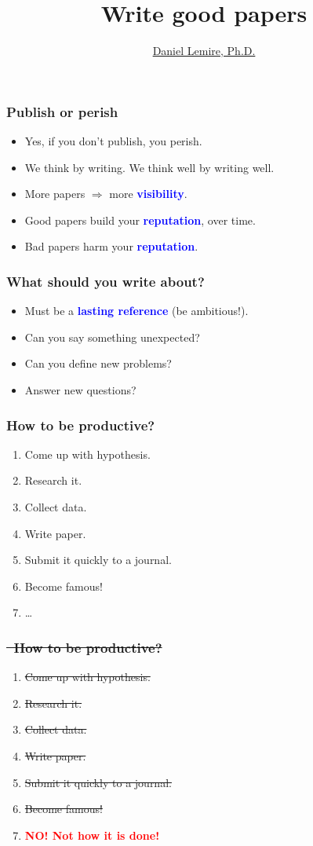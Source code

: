 \documentclass[handout]{beamer}
\title{Write good papers}
\date{}
\author{\href{http://lemire.me/en/}{Daniel Lemire, Ph.D.}}
\institute{
  Professor of Computer Science\\
  University of Quebec\\
	\url{http://lemire.me/en/}\\
	blog: \url{http://lemire.me/blog/}\\
	~\\
}
\date{}
\newcommand{\vimportant}[1]{\textcolor{red}{\textbf{#1}}}
\newcommand{\important}[1]{\textcolor{blue}{\textbf{#1}}}
\begin{document}
\frame{\titlepage}



\frame
{
  \frametitle{Publish or perish}
 \begin{itemize}
  \item<1-> Yes, if you don't publish, you perish.
\item<2-> We think by writing. We think well by writing well.
   \item<3-> More papers $\Rightarrow$ more \important{visibility}.
   \item<4-> Good papers build your \important{reputation}, over time.
   \item<5-> Bad papers harm your \important{reputation}.
 \end{itemize}
}




\frame
{
  \frametitle{What should you write about?}
 \begin{itemize}
  \item<1-> Must be a \important{lasting reference} (be ambitious!).
  \item<2-> Can you say something unexpected?
    \item<3-> Can you define new problems?
    \item<4-> Answer new questions?
  \end{itemize}
}


\frame
{
  \frametitle{How to be productive?}
 \begin{enumerate}
 \item Come up with hypothesis.
  \item Research it.
  \item Collect data.
  \item Write paper.
  \item Submit it quickly to a journal.
  \item Become famous!
  \item \ldots
 \end{enumerate}
}


\frame
{
  \frametitle{\sout{ How to be productive?} }
 \begin{enumerate}
 \item \sout {Come up with hypothesis.}
  \item \sout{ Research it.}
  \item \sout {Collect data.}
  \item \sout {Write paper.}
  \item \sout {Submit it quickly to a journal.}
  \item \sout {Become famous!}
  \item {\Large \vimportant{NO! Not how it is done!}}
 \end{enumerate}
}
\end{document}

